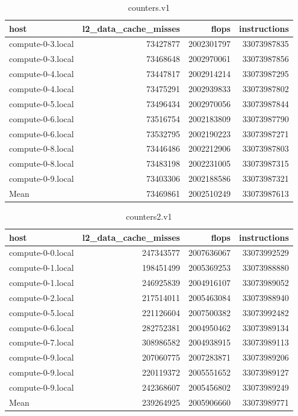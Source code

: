 \documentclass[12pt]{article}
\begin{document}
\newpage

\begin{table}[h!]
	\centering
	\begin{tabular}{|l|r|r|r|}
		\hline
		host & l2\_data\_cache\_misses & flops & instructions \\
		\hline
		compute-0-3.local & 73427877 & 2002301797 & 33073987835 \\
		compute-0-3.local & 73468648 & 2002970061 & 33073987856 \\
		compute-0-4.local & 73447817 & 2002914214 & 33073987295 \\
		compute-0-4.local & 73475291 & 2002939833 & 33073987802 \\
		compute-0-5.local & 73496434 & 2002970056 & 33073987844 \\
		compute-0-6.local & 73516754 & 2002183809 & 33073987790 \\
		compute-0-6.local & 73532795 & 2002190223 & 33073987271 \\
		compute-0-8.local & 73446486 & 2002212906 & 33073987803 \\
		compute-0-8.local & 73483198 & 2002231005 & 33073987315 \\
		compute-0-9.local & 73403306 & 2002188586 & 33073987321 \\
		\hline
		\hline
		Mean & 73469861 & 2002510249 & 33073987613 \\
		\hline
	\end{tabular}
	\caption{counters.v1}
\label{tab:countersv1}
\end{table}

\begin{table}[h!]
	\centering
	\begin{tabular}{|l|r|r|r|}
		\hline
		host & l2\_data\_cache\_misses & flops & instructions \\
		\hline
		compute-0-0.local & 247343577 & 2007636067 & 33073992529 \\
		compute-0-1.local & 198451499 & 2005369253 & 33073988880 \\
		compute-0-1.local & 246925839 & 2004916107 & 33073989052 \\
		compute-0-2.local & 217514011 & 2005463084 & 33073988940 \\
		compute-0-5.local & 221126604 & 2007500382 & 33073992482 \\
		compute-0-6.local & 282752381 & 2004950462 & 33073989134 \\
		compute-0-7.local & 308986582 & 2004938915 & 33073989113 \\
		compute-0-9.local & 207060775 & 2007283871 & 33073989206 \\
		compute-0-9.local & 220119372 & 2005551652 & 33073989127 \\
		compute-0-9.local & 242368607 & 2005456802 & 33073989249 \\
		\hline
		\hline
		Mean & 239264925 & 2005906660 & 33073989771 \\
		\hline
	\end{tabular}
	\caption{counters2.v1}
	\label{tab:counters2v1}
\end{table}
\end{document}
